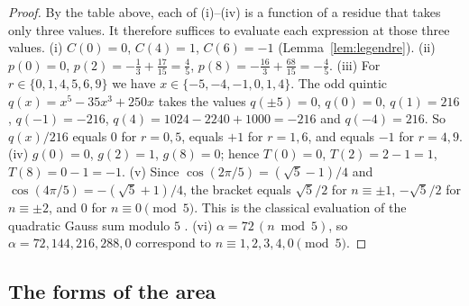 \documentclass[11pt,a4paper]{article}
\theoremstyle{plain}
\theoremstyle{definition}
\theoremstyle{remark}
\begin{document}
\begin{proof}
By the table above, each of (i)–(iv) is a function of a residue that takes only three values. It therefore suffices to evaluate each expression at those three values.
(i) $C(0)=0$, $C(4)=1$, $C(6)=-1$ (Lemma~\ref{lem:legendre}).
(ii) $p(0)=0$, $p(2)=-\tfrac13+\tfrac{17}{15}=\tfrac45$, $p(8)=-\tfrac{16}{3}+\tfrac{68}{15}=-\tfrac45$.
(iii) For $r\in\{0,1,4,5,6,9\}$ we have $x\in\{-5,-4,-1,0,1,4\}$. The odd quintic $q(x)=x^{5}-35x^{3}+250x$ takes the values $q(\pm5)=0$, $q(0)=0$, $q(1)=216$, $q(-1)=-216$, $q(4)=1024-2240+1000=-216$ and $q(-4)=216$. So $q(x)/216$ equals $0$ for $r=0,5$, equals $+1$ for $r=1,6$, and equals $-1$ for $r=4,9$.
(iv) $g(0)=0$, $g(2)=1$, $g(8)=0$; hence $T(0)=0$, $T(2)=2-1=1$, $T(8)=0-1=-1$.
(v) Since $\cos(2\pi/5)=(\sqrt5-1)/4$ and $\cos(4\pi/5)=-(\sqrt5+1)/4$, the bracket equals $\sqrt5/2$ for $n\equiv\pm1$, $-\sqrt5/2$ for $n\equiv\pm2$, and $0$ for $n\equiv0\pmod5$. This is the classical evaluation of the quadratic Gauss sum modulo $5$ \cite{IrelandRosen1990}.
(vi) $\alpha=72\,(n\bmod5)$, so $\alpha=72,144,216,288,0$ correspond to $n\equiv1,2,3,4,0\pmod5$.
\end{proof}

\subsection{The forms of the area}
\end{document}
